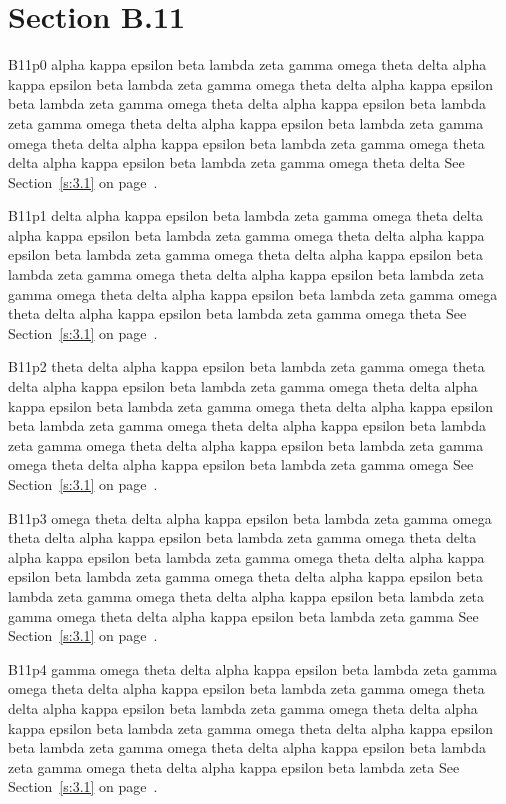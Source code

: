 \section{Section B.11}\label{s:B.11}
B11p0 alpha kappa epsilon beta lambda zeta gamma omega theta delta alpha kappa epsilon beta lambda zeta gamma omega theta delta alpha kappa epsilon beta lambda zeta gamma omega theta delta alpha kappa epsilon beta lambda zeta gamma omega theta delta alpha kappa epsilon beta lambda zeta gamma omega theta delta alpha kappa epsilon beta lambda zeta gamma omega theta delta alpha kappa epsilon beta lambda zeta gamma omega theta delta See Section~\ref{s:3.1} on page~\pageref{s:3.1}.

B11p1 delta alpha kappa epsilon beta lambda zeta gamma omega theta delta alpha kappa epsilon beta lambda zeta gamma omega theta delta alpha kappa epsilon beta lambda zeta gamma omega theta delta alpha kappa epsilon beta lambda zeta gamma omega theta delta alpha kappa epsilon beta lambda zeta gamma omega theta delta alpha kappa epsilon beta lambda zeta gamma omega theta delta alpha kappa epsilon beta lambda zeta gamma omega theta See Section~\ref{s:3.1} on page~\pageref{s:3.1}.

B11p2 theta delta alpha kappa epsilon beta lambda zeta gamma omega theta delta alpha kappa epsilon beta lambda zeta gamma omega theta delta alpha kappa epsilon beta lambda zeta gamma omega theta delta alpha kappa epsilon beta lambda zeta gamma omega theta delta alpha kappa epsilon beta lambda zeta gamma omega theta delta alpha kappa epsilon beta lambda zeta gamma omega theta delta alpha kappa epsilon beta lambda zeta gamma omega See Section~\ref{s:3.1} on page~\pageref{s:3.1}.

B11p3 omega theta delta alpha kappa epsilon beta lambda zeta gamma omega theta delta alpha kappa epsilon beta lambda zeta gamma omega theta delta alpha kappa epsilon beta lambda zeta gamma omega theta delta alpha kappa epsilon beta lambda zeta gamma omega theta delta alpha kappa epsilon beta lambda zeta gamma omega theta delta alpha kappa epsilon beta lambda zeta gamma omega theta delta alpha kappa epsilon beta lambda zeta gamma See Section~\ref{s:3.1} on page~\pageref{s:3.1}.

B11p4 gamma omega theta delta alpha kappa epsilon beta lambda zeta gamma omega theta delta alpha kappa epsilon beta lambda zeta gamma omega theta delta alpha kappa epsilon beta lambda zeta gamma omega theta delta alpha kappa epsilon beta lambda zeta gamma omega theta delta alpha kappa epsilon beta lambda zeta gamma omega theta delta alpha kappa epsilon beta lambda zeta gamma omega theta delta alpha kappa epsilon beta lambda zeta See Section~\ref{s:3.1} on page~\pageref{s:3.1}.

